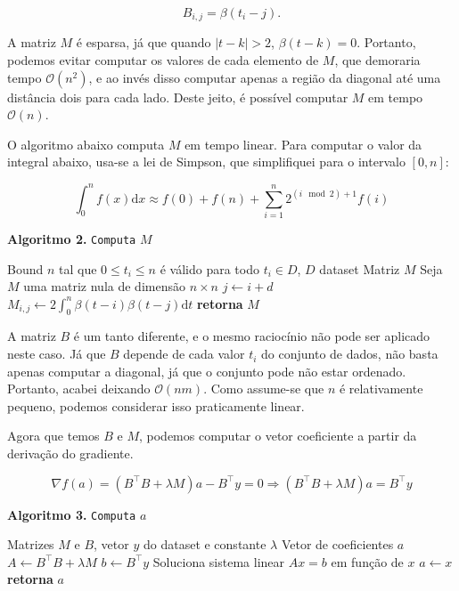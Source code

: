 \documentclass[12pt]{article}
\theoremstyle{plain}
\numberwithin{equation}{section}
\renewcommand{\implies}{\Rightarrow}
\newcommand{\bigo}{\mathcal{O}}
\newcommand{\code}[1]{\lstinline[mathescape=true]{#1}}
\begin{document}
\begin{equation*}
  B_{i,j}=\beta(t_i-j).
\end{equation*}

A matriz $M$ é esparsa, já que quando $|t-k|>2$, $\beta(t-k)=0$. Portanto, podemos evitar computar
os valores de cada elemento de $M$, que demoraria tempo $\bigo(n^2)$, e ao invés disso computar
apenas a região da diagonal até uma distância dois para cada lado. Deste jeito, é possível computar
$M$ em tempo $\bigo(n)$.

O algoritmo abaixo computa $M$ em tempo linear. Para computar o valor da integral abaixo, usa-se a
lei de Simpson, que simplifiquei para o intervalo $[0,n]$:

\begin{equation*}
  \int_{0}^n f(x)\mathrm{d}x\approx f(0)+f(n)+\sum_{i=1}^n 2^{(i\mod 2)+1}f(i)
\end{equation*}

\begin{algorithm}[h]
  \caption*{\textbf{Algoritmo 2.} \code{Computa} $M$}
  \begin{algorithmic}[1]
    \Require Bound $n$ tal que $0\leq t_i\leq n$ é válido para todo $t_i\in D$, $D$ dataset
    \Ensure Matriz $M$
    \State Seja $M$ uma matriz nula de dimensão $n\times n$
    \For{inteiro $i$ no intervalo $[0,n)$}
        \State $j\gets i+d$
          \State $M_{i,j}\gets 2\int_0^n \beta(t-i)\beta(t-j)\mathrm{d}t$
        \EndIf%
      \EndFor%
    \EndFor%
    \State\textbf{retorna} $M$
  \end{algorithmic}
\end{algorithm}

A matriz $B$ é um tanto diferente, e o mesmo raciocínio não pode ser aplicado neste caso. Já que
$B$ depende de cada valor $t_i$ do conjunto de dados, não basta apenas computar a diagonal, já que
o conjunto pode não estar ordenado. Portanto, acabei deixando $\bigo(nm)$. Como assume-se que $n$ é
relativamente pequeno, podemos considerar isso praticamente linear.

Agora que temos $B$ e $M$, podemos computar o vetor coeficiente a partir da derivação do gradiente.

\begin{equation*}
  \nabla f(a)=(B^\intercal B+\lambda M)a-B^\intercal y=0\implies (B^\intercal B+\lambda
  M)a=B^\intercal y
\end{equation*}

\begin{algorithm}[h]
  \caption*{\textbf{Algoritmo 3.} \code{Computa} $a$}
  \begin{algorithmic}[1]
    \Require Matrizes $M$ e $B$, vetor $y$ do dataset e constante $\lambda$
    \Ensure Vetor de coeficientes $a$
    \State $A\gets B^\intercal B+\lambda M$
    \State $b\gets B^\intercal y$
    \State Soluciona sistema linear $Ax=b$ em função de $x$
    \State $a\gets x$
    \State\textbf{retorna} $a$
  \end{algorithmic}
\end{algorithm}
\end{document}
